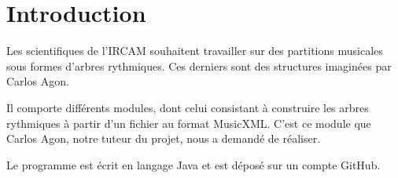 \section{Introduction}

Les scientifiques de l'IRCAM souhaitent travailler sur des partitions musicales sous formes d'arbres rythmiques. Ces derniers sont des structures imaginées par Carlos Agon.

\par
Il comporte différents modules, dont celui consistant à construire les arbres rythmiques à partir d'un fichier au format MusicXML. C'est ce module que Carlos Agon, notre tuteur du projet, nous a demandé de réaliser.

\par
Le programme est écrit en langage Java et est déposé sur un compte GitHub.
